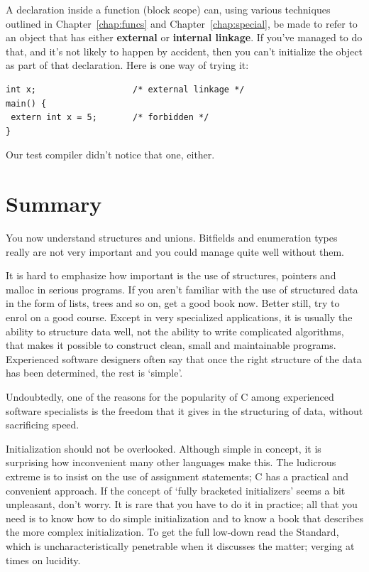    A declaration inside a function (block scope) can, using various
   techniques
   outlined in Chapter~\ref{chap:funcs} and Chapter~\ref{chap:special},
    be made to refer to an object that has either \textbf{external} or
    \textbf{internal linkage}. If you've managed to do that, and it's not
    likely to happen by accident, then you can't initialize the object as part
    of that declaration. Here is one way of trying it:


   \begin{Verbatim}
int x;                   /* external linkage */
main() {
 extern int x = 5;       /* forbidden */
}
\end{Verbatim}

   Our test compiler didn't notice that one, either.


  

 
        \section{Summary}
        


  You now understand structures and unions. Bitfields and enumeration types
   really are not very important and you could manage quite well without
   them.


  It is hard to emphasize how important is the use of structures, pointers
   and malloc in serious programs. If you aren't familiar with the use of
   structured data in the form of lists, trees and so on, get a good book now.
   Better still, try to enrol on a good course. Except in very specialized
   applications, it is usually the ability to structure data well, not the
   ability to write complicated algorithms, that makes it possible to construct
   clean, small and maintainable programs. Experienced software designers often
   say that once the right structure of the data has been determined, the rest
   is `simple'.


  Undoubtedly, one of the reasons for the popularity of C among experienced
   software specialists is the freedom that it gives in the structuring of
   data, without sacrificing speed.


  Initialization should not be overlooked. Although simple in concept, it is
   surprising how inconvenient many other languages make this. The ludicrous
   extreme is to insist on the use of assignment statements; C has a practical
   and convenient approach. If the concept of `fully bracketed
   initializers' seems a bit unpleasant, don't worry. It is rare that you
   have to do it in practice; all that you need is to know how to do simple
   initialization and to know a book that describes the more complex
   initialization. To get the full low-down read the Standard, which is
   uncharacteristically penetrable when it discusses the matter; verging at
   times on lucidity.


